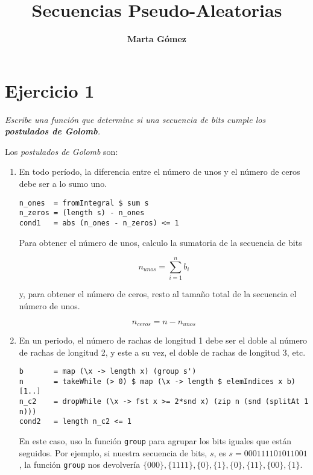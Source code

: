 \documentclass[10pt,spanish]{article}
\title{\fontfamily{pag}\selectfont \bfseries \Huge \color{azul} Secuencias Pseudo-Aleatorias}
\author{\fontfamily{pag}\selectfont \bfseries \LARGE Marta Gómez}
\begin{document}
\maketitle

\renewcommand{\tablename}{Tabla}

\section{\textcolor{azul}Ejercicio 1}
\textit{Escribe una función que determine si una secuencia de bits cumple los \textbf{\textcolor{azul}{postulados de Golomb}}.}

Los \textit{\textcolor{azul}{postulados de Golomb}} son:

\begin{enumerate}[1.]
\item En todo período, la diferencia entre el número de unos y el número de ceros debe ser a lo sumo uno.

\begin{verbatim}
n_ones  = fromIntegral $ sum s
n_zeros = (length s) - n_ones
cond1   = abs (n_ones - n_zeros) <= 1
\end{verbatim}

Para obtener el número de unos, calculo la sumatoria de la secuencia de bits 

\begin{displaymath}
    n_{unos} = \sum_{i=1}^n b_i
\end{displaymath}

y, para obtener el número de ceros, resto al tamaño total de la secuencia el número de unos.

\begin{displaymath}
    n_{ceros} = n - n_{unos}
\end{displaymath}

\item En un periodo, el número de rachas de longitud 1 debe ser el doble al número de rachas de longitud 2, y este a su vez, el doble de rachas de longitud 3, etc.

\begin{verbatim}
b       = map (\x -> length x) (group s')
n       = takeWhile (> 0) $ map (\x -> length $ elemIndices x b) [1..]
n_c2    = dropWhile (\x -> fst x >= 2*snd x) (zip n (snd (splitAt 1 n))) 
cond2   = length n_c2 <= 1
\end{verbatim}

En este caso, uso la función \texttt{group} para agrupar los bits iguales que están seguidos. Por ejemplo, si nuestra secuencia de bits, $s$, es $s=000111101011001$, la función \texttt{group} nos devolvería $\{000\},\{1111\},\{0\},\{1\},\{0\},\{11\},\{00\},\{1\}$.



\end{enumerate}
\end{document}
